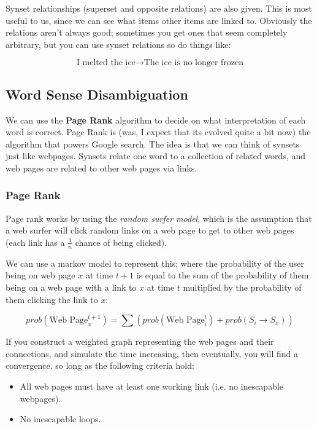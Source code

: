Synset relationships (superset and opposite relations) are also given. This is
most useful to us, since we can see what items other items are linked to.
Obviously the relations aren't always good; sometimes you get ones that seem
completely arbitrary, but you can use synset relations so do things like:

\[
  \text{I melted the ice} \rightarrow \text{The ice is no longer frozen}
\] 

\subsection{Word Sense Disambiguation}

We can use the \textbf{Page Rank} algorithm to decide on what interpretation of
each word is correct. Page Rank is (was, I expect that its evolved quite a bit
now) the algorithm that powers Google search. The idea is that we can think of
synsets just like webpages. Synsets relate one word to a collection of related
words, and web pages are related to other web pages via links.

\subsubsection{Page Rank}

Page rank works by using the \textit{random surfer model}, which is the
assumption that a web surfer will click random links on a web page to get to
other web pages (each link has a $\frac{1}{n}$ chance of being clicked).

We can use a markov model to represent this; where the probability of the user
being on web page $x$ at time $t + 1$ is equal to the sum of the probability of
them being on a web page with a link to $x$ at time $t$ multiplied by the
probability of them clicking the link to $x$:

\[
  prob(\text{Web Page}_x^{t + 1}) =
    \sum (prob(\text{Web Page}_i^t) + prob(S_i \rightarrow S_x))
\]

If you construct a weighted graph representing the web pages and their
connections, and simulate the time increasing, then eventually, you will find a
convergence, so long as the following criteria hold:

\begin{itemize}
  \item All web pages must have at least one working link (i.e. no inescapable
    webpages).
  \item No inescapable loops.
\end{itemize}

